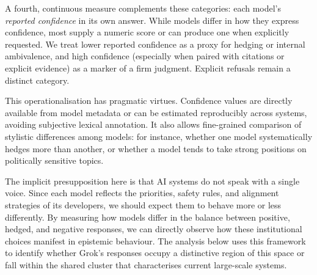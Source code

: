 \documentclass[12pt]{article}
\begin{document}
A fourth, continuous measure complements these categories: each model’s \textit{reported confidence} in its own answer.
While models differ in how they express confidence, most supply a numeric score or can produce one when explicitly requested.
We treat lower reported confidence as a proxy for hedging or internal ambivalence, and high confidence (especially when paired with citations or explicit evidence) as a marker of a firm judgment.
Explicit refusals remain a distinct category.

This operationalisation has pragmatic virtues.
Confidence values are directly available from model metadata or can be estimated reproducibly across systems, avoiding subjective lexical annotation.
It also allows fine-grained comparison of stylistic differences among models: for instance, whether one model systematically hedges more than another, or whether a model tends to take strong positions on politically sensitive topics.

The implicit presupposition here is that AI systems do not speak with a single voice.
Since each model reflects the priorities, safety rules, and alignment strategies of its developers, we should expect them to behave more or less differently.
By measuring how models differ in the balance between positive, hedged, and negative responses, we can directly observe how these institutional choices manifest in epistemic behaviour.
The analysis below uses this framework to identify whether Grok’s responses occupy a distinctive region of this space or fall within the shared cluster that characterises current large-scale systems.
\end{document}
